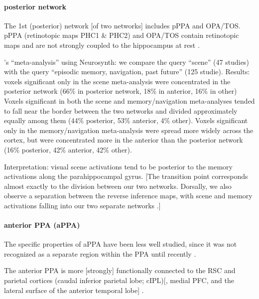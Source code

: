 \documentclass[english]{article}
\begin{document}
\paragraph{posterior network}

The 1st (posterior) network [of two networks] includes
pPPA and OPA/TOS. pPPA (retinotopic maps PHC1 \& PHC2) and OPA/TOS contain
retinotopic maps and are not strongly coupled to the hippocampus at rest
\citep{baldassano2016two}.

\citep{baldassano2016two}'s ``meta-analysis'' using Neurosynth: we compare the
query ``scene'' (47 studies) with the query ``episodic memory, navigation, past
future'' (125 studie).
%
Results: voxels significant only in the scene meta-analysis were concentrated in
the posterior network (66\% in posterior network, 18\% in anterior, 16\% in
other) %
\citep{baldassano2016two} Voxels significant in both the scene and
memory/navigation meta-analyses tended to fall near the border between the two
networks and divided approximately equally among them (44\% posterior, 53\%
anterior, 4\% other).
%
\citep{baldassano2016two} Voxels significant only in the memory/navigation
meta-analysis were spread more widely across the cortex, but were concentrated
more in the anterior than the posterior network (16\% posterior, 42\% anterior,
42\% other).

Interpretation: visual scene activations tend to be posterior to the memory
activations along the parahippocampal gyrus. [The transition point corresponds
almost exactly to the division between our two networks. Dorsally, we also
observe a separation between the reverse inference maps, with scene and memory
activations falling into our two separate networks \citep{baldassano2016two}.]


\paragraph{anterior PPA (aPPA)}

The specific properties of aPPA have been less well studied, since it was not
recognized as a separate region within the PPA until recently
\citep{baldassano2016two}.

The anterior PPA is more [strongly] functionally connected to the RSC and
parietal cortices (caudal inferior parietal lobe; cIPL)[, medial PFC, and the
lateral surface of the anterior temporal lobe]
\citep{baldassano2013differential, baldassano2016two}.
\end{document}
